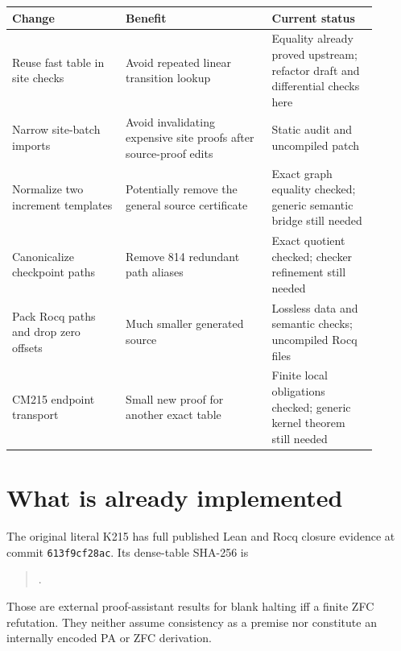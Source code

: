 \documentclass[11pt]{article}
\begin{document}
\begin{center}\small
\renewcommand{\arraystretch}{1.08}
\begin{tabular}{>{\raggedright\arraybackslash}p{0.28\linewidth}>{\raggedright\arraybackslash}p{0.36\linewidth}>{\raggedright\arraybackslash}p{0.26\linewidth}}
\toprule
Change & Benefit & Current status\\\midrule
Reuse fast table in site checks & Avoid repeated linear transition lookup & Equality already proved upstream; refactor draft and differential checks here\\
Narrow site-batch imports & Avoid invalidating expensive site proofs after source-proof edits & Static audit and uncompiled patch\\
Normalize two increment templates & Potentially remove the general source certificate & Exact graph equality checked; generic semantic bridge still needed\\
Canonicalize checkpoint paths & Remove 814 redundant path aliases & Exact quotient checked; checker refinement still needed\\
Pack Rocq paths and drop zero offsets & Much smaller generated source & Lossless data and semantic checks; uncompiled Rocq files\\
CM215 endpoint transport & Small new proof for another exact table & Finite local obligations checked; generic kernel theorem still needed\\
\bottomrule
\end{tabular}
\end{center}

\section{What is already implemented}
The original literal K215 has full published Lean and Rocq closure evidence at commit \texttt{613f9cf28ac}. Its dense-table SHA-256 is
\begin{quote}\small{}.\end{quote}
Those are external proof-assistant results for blank halting iff a finite ZFC refutation. They neither assume consistency as a premise nor constitute an internally encoded PA or ZFC derivation.
\end{document}
